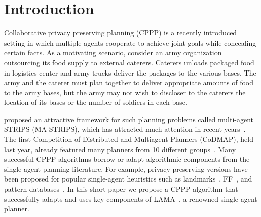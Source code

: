 \documentclass[letterpaper]{article}
\theoremstyle{definition}
\begin{document}
\section{Introduction}

Collaborative privacy preserving planning (CPPP) is a recently introduced setting in which multiple agents cooperate to achieve joint goals while concealing certain facts. As a motivating scenario, consider an army organization outsourcing its food supply to external caterers. Caterers unloads packaged food in logistics center and army trucks deliver the packages to the various bases. The army and the caterer must plan together to deliver appropriate amounts of food to the army bases, but the army may not wish to discloser to the caterers the location of its bases or the number of soldiers in each base. %


\cite{brafman2013complexity} proposed an attractive framework for such planning problems called multi-agent STRIPS (MA-STRIPS), which has attracted much attention in recent  years~\citep{tozicak2015onInternally,torreno2015global,vstolba2014relaxation,maliah2014privacyPreserving}. The first Competition of Distributed and Multiagent Planners (CoDMAP), held last year, already featured many planners from 10 different groups~\cite{vstolba2015competition}. 
Many successful CPPP algorithms borrow or adapt algorithmic components from the single-agent planning literature. For example, privacy preserving versions have been proposed for popular single-agent heuristics such as landmarks~\citep{maliah2014privacyPreserving,torreno2015global,vstolba2015admissible}, FF~\citep{vstolba2014relaxation}, and pattern databases~\citep{maliah2015privacy}. In this short paper we propose a CPPP algorithm that successfully adapts and uses key components of LAMA~\citep{richter2010lama}, a renowned single-agent planner. 
\end{document}
